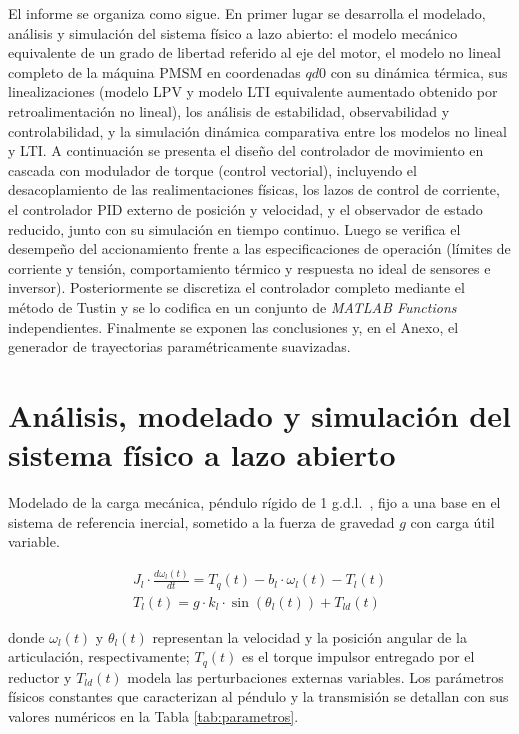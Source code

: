 \documentclass[12pt, a4paper,journal, onecolumn, compsoc]{IEEEtran}
\begin{document}
El informe se organiza como sigue. En primer lugar se desarrolla el modelado, análisis y simulación del sistema físico a lazo abierto: el modelo mecánico equivalente de un grado de libertad referido al eje del motor, el modelo no lineal completo de la máquina PMSM en coordenadas $qd0$ con su dinámica térmica, sus linealizaciones (modelo LPV y modelo LTI equivalente aumentado obtenido por retroalimentación no lineal), los análisis de estabilidad, observabilidad y controlabilidad, y la simulación dinámica comparativa entre los modelos no lineal y LTI. A continuación se presenta el diseño del controlador de movimiento en cascada con modulador de torque (control vectorial), incluyendo el desacoplamiento de las realimentaciones físicas, los lazos de control de corriente, el controlador PID externo de posición y velocidad, y el observador de estado reducido, junto con su simulación en tiempo continuo. Luego se verifica el desempeño del accionamiento frente a las especificaciones de operación (límites de corriente y tensión, comportamiento térmico y respuesta no ideal de sensores e inversor). Posteriormente se discretiza el controlador completo mediante el método de Tustin y se lo codifica en un conjunto de \textit{MATLAB Functions} independientes. Finalmente se exponen las conclusiones y, en el Anexo, el generador de trayectorias paramétricamente suavizadas.

\section{Análisis, modelado y simulación del sistema físico a lazo abierto}
Modelado de la carga mecánica, péndulo rígido de 1 g.d.l.~\cite{kelly_robot}, fijo a una base en el sistema de referencia inercial, sometido a la fuerza de gravedad \(g\) con carga útil variable.

\begin{align}
    J_l\cdot \frac{d\omega_l(t)}{dt} = T_q(t) - b_l\cdot \omega_l(t) - T_l(t)  \\
    T_l(t) = g\cdot k_l \cdot \sin(\theta_l(t)) + T_{ld}(t)
\end{align}

donde $\omega_l(t)$ y $\theta_l(t)$ representan la velocidad y la posición angular de la articulación, respectivamente; $T_q(t)$ es el torque impulsor entregado por el reductor y $T_{ld}(t)$ modela las perturbaciones externas variables. Los parámetros físicos constantes que caracterizan al péndulo y la transmisión se detallan con sus valores numéricos en la Tabla \ref{tab:parametros}.
\end{document}
